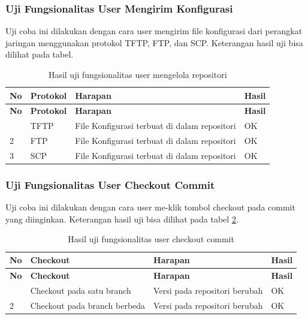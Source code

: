 	\subsubsection{Uji Fungsionalitas User Mengirim Konfigurasi}
    Uji coba ini dilakukan dengan cara user mengirim file konfigurasi dari perangkat jaringan menggunakan protokol TFTP, FTP, dan SCP. Keterangan hasil uji bisa dilihat pada tabel.
    \begin{longtable}{|p{}|p{}|p{}|p{}|}
    	
    	\caption{Hasil uji fungsionalitas user mengelola repositori} \label{hasilmengelolaRepositori} \\
    	\hline
    	\textbf{No} & \textbf{Protokol} & \textbf{Harapan} & \textbf{Hasil} \\ \hline
    	\endfirsthead
    	
    	\hline
    	\textbf{No} & \textbf{Protokol} & \textbf{Harapan} & \textbf{Hasil} \\ \hline
    	\endhead
    	\endfoot
    	\endlastfoot
    	1 & TFTP & File Konfigurasi terbuat di dalam repositori & OK\\ \hline
    	2 & FTP & File Konfigurasi terbuat di dalam repositori & OK\\ \hline
    	3 & SCP & File Konfigurasi terbuat di dalam repositori & OK\\ \hline
    	
    \end{longtable}

	\subsubsection{Uji Fungsionalitas User Checkout Commit}
	Uji coba ini dilakukan dengan cara user me-klik tombol checkout pada commit yang diinginkan. Keterangan hasil uji bisa dilihat pada tabel \ref{hasilCheckoutCommit}.
	\begin{longtable}{|p{}|p{}|p{}|p{}|}
		
		\caption{Hasil uji fungsionalitas user checkout commit} \label{hasilCheckoutCommit} \\
		\hline
		\textbf{No} & \textbf{Checkout} & \textbf{Harapan} & \textbf{Hasil} \\ \hline
		\endfirsthead
		\hline
		\textbf{No} & \textbf{Checkout} & \textbf{Harapan} & \textbf{Hasil} \\ \hline
		\endhead
		\endfoot
		\endlastfoot
		1 & Checkout pada satu branch & Versi pada repositori berubah & OK\\ \hline
		2 & Checkout pada branch berbeda & Versi pada repositori berubah & OK\\ \hline
		
	\end{longtable}


